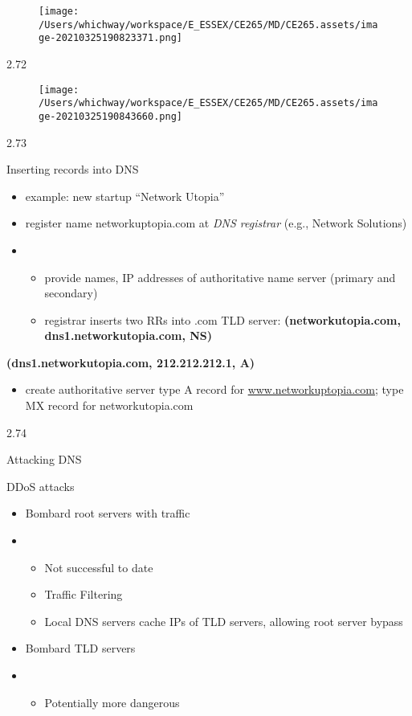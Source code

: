 \documentclass[
]{article}
\begin{document}
\begin{figure}
\centering
\texttt{[image: /Users/whichway/workspace/E\_ESSEX/CE265/MD/CE265.assets/image-20210325190823371.png]}
\caption{}
\end{figure}

2.72

\begin{figure}
\centering
\texttt{[image: /Users/whichway/workspace/E\_ESSEX/CE265/MD/CE265.assets/image-20210325190843660.png]}
\caption{}
\end{figure}

2.73

Inserting records into DNS

\begin{itemize}
\item
  example: new startup ``Network Utopia''
\item
  register name networkuptopia.com at \emph{DNS registrar} (e.g.,
  Network Solutions)
\item
  \begin{itemize}
  \item
    provide names, IP addresses of authoritative name server (primary
    and secondary)
  \item
    registrar inserts two RRs into .com TLD server:
    \textbf{(networkutopia.com, dns1.networkutopia.com, NS)}
  \end{itemize}
\end{itemize}

\textbf{(dns1.networkutopia.com, 212.212.212.1, A)}

\begin{itemize}
\item
  create authoritative server type A record for
  \url{www.networkuptopia.com}; type MX record for networkutopia.com
\end{itemize}

2.74

Attacking DNS

DDoS attacks

\begin{itemize}
\item
  Bombard root servers with traffic
\item
  \begin{itemize}
  \item
    Not successful to date
  \item
    Traffic Filtering
  \item
    Local DNS servers cache IPs of TLD servers, allowing root server
    bypass
  \end{itemize}
\item
  Bombard TLD servers
\item
  \begin{itemize}
  \item
    Potentially more dangerous
  \end{itemize}
\end{itemize}
\end{document}
